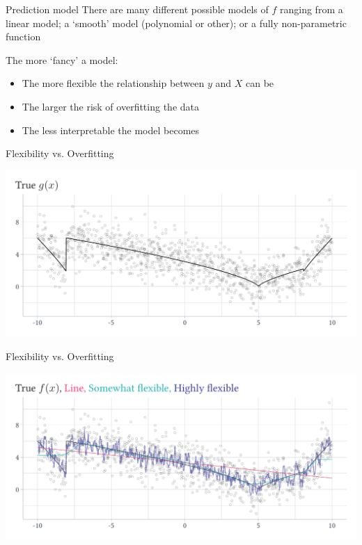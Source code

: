 \documentclass[aspectratio=169,t,11pt,table]{beamer}
\begin{document}

\begin{frame}{Prediction model}
  There are many different possible models of $f$ ranging from a linear model; a `smooth' model (polynomial or other); or a fully non-parametric function
  
  \bigskip
  The more `fancy' a model:
  \begin{itemize}
    \item The more \alert{flexible} the relationship between $y$ and $X$ can be
    
    \item The larger the risk of \alert{overfitting} the data
    
    \item The less \alert{interpretable} the model becomes
  \end{itemize}
\end{frame}

\begin{frame}{Flexibility vs. Overfitting}
  \vspace{-\bigskipamount}
  \begin{center}
    \includegraphics[width = \textwidth]{figures/f_examples_plot_dgp.pdf}
  \end{center}
\end{frame}

\begin{frame}{Flexibility vs. Overfitting}
  \vspace{-\bigskipamount}
  \begin{center}
    \includegraphics[width = \textwidth]{figures/f_examples_overfitting.pdf}
  \end{center}
\end{frame}
\end{document}
